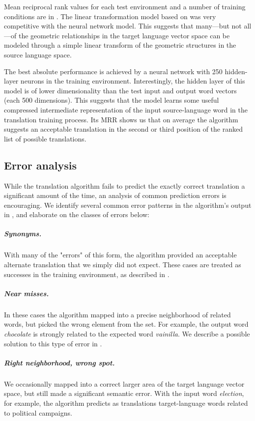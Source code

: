 \documentclass[11pt]{article}
\begin{document}
Mean reciprocal rank values for each test environment and a number of training
conditions are in . The linear transformation model based on
 was very competitive with the neural network
model. This suggests that many---but not all---of the geometric relationships in
the target language vector space can be modeled through a simple linear
transform of the geometric structures in the source language space.

The best absolute performance is achieved by a neural network with 250
hidden-layer neurons in the  training environment. Interestingly, the
hidden layer of this model is of lower dimensionality than the test input and
output word vectors (each 500 dimensions). This suggests that the model learns
some useful compressed intermediate representation of the input source-language
word in the translation training process. Its MRR shows us that on average the
algorithm suggests an acceptable translation in the second or third position of
the ranked list of possible translations.

\subsection{Error analysis}
\label{subsec:error-analysis}

While the translation algorithm fails to predict the exactly correct translation a
significant amount of the time, an analysis of common prediction errors is encouraging.
We identify several common error patterns in the
algorithm's output in , and elaborate on the classes of errors below:

\subparagraph{Synonyms.} With many of the "errors" of this form, the algorithm
provided an acceptable alternate translation that we simply did not expect.
These cases are treated as successes in the  training environment, as
described in .

\subparagraph{Near misses.} In these cases the algorithm mapped into a precise
neighborhood of related words, but picked the wrong element from the set. For
example, the output word \textit{chocolate} is strongly related to the expected
word \textit{vainilla}. We describe a possible solution to this type of error in
.

\subparagraph{Right neighborhood, wrong spot.} We occasionally mapped into a
correct larger area of the target language vector space, but still made a
significant semantic error. With the input word \textit{election}, for example,
the algorithm predicts as translations target-language words related to
political campaigns.
\end{document}

